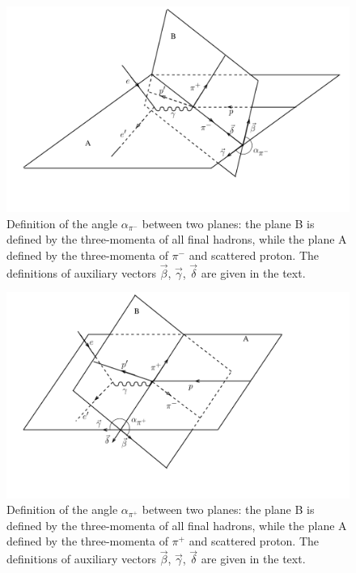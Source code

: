 \begin{figure}[htp]
\begin{center}
\includegraphics[width=12cm]{pictures/cross_sction/angles/alpha1.pdf}
\caption{\small Definition of the angle $\alpha_{\pi^{-}}$ between two planes: the plane B is defined by the three-momenta of all final hadrons, while the plane A defined by  the three-momenta of $\pi^{-}$ and scattered proton. The definitions of  auxiliary vectors $\vec \beta$, $\vec \gamma$, $\vec \delta$ are given in the text.} \label{fig:cr_sec_kinematic2}
\end{center}
\end{figure}



\begin{figure}[htp]
\begin{center}
\includegraphics[width=12cm]{pictures/cross_sction/angles/alpha3.pdf}
\caption{\small Definition of the angle $\alpha_{\pi^{+}}$ between two planes: the plane B is defined by the three-momenta of all final hadrons, while the plane A defined by  the three-momenta of $\pi^{+}$ and scattered proton. The definitions of  auxiliary vectors $\vec \beta$, $\vec \gamma$, $\vec \delta$ are given in the text.} \label{fig:cr_sec_kinematic3}
\end{center}
\end{figure}

